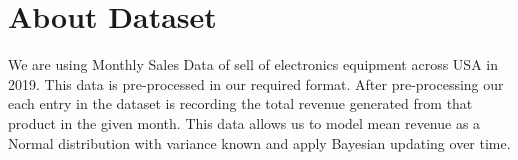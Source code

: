 \section{About Dataset}

We are using Monthly Sales Data of sell of electronics equipment across USA in 2019.
This data is pre-processed in our required format.
After pre-processing our each entry in the dataset is recording the total revenue generated from that product in the given month.
This data allows us to model mean revenue as a Normal distribution with variance known and apply Bayesian updating over time.
